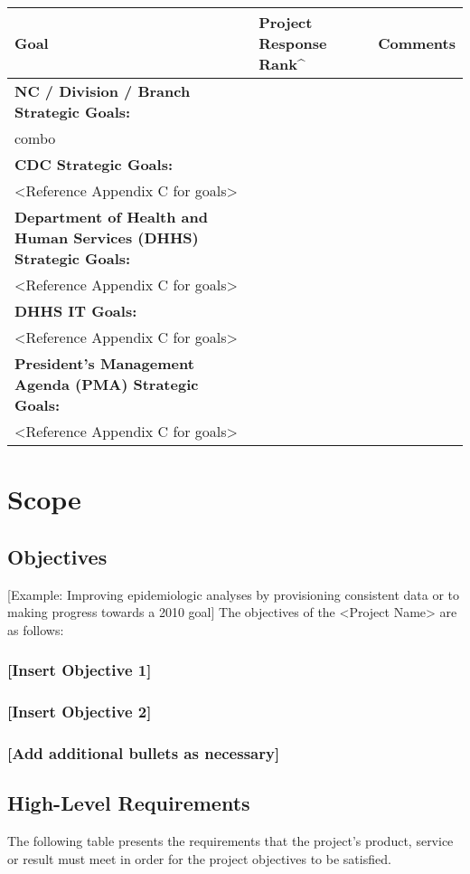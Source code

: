 \documentclass[11pt]{article}
\begin{document}
\begin{center}
\begin{tabular}{lll}
Goal & Project Response Rank\^{}\footnotemark & Comments\\
\hline
\textbf{NC / Division / Branch Strategic Goals:} &  & \\
combo &  & \\
\textbf{CDC Strategic Goals:} &  & \\
<Reference Appendix C for goals> &  & \\
\textbf{Department of Health and Human Services (DHHS) Strategic Goals:} &  & \\
<Reference Appendix C for goals> &  & \\
\textbf{DHHS IT Goals:} &  & \\
<Reference Appendix C for goals> &  & \\
\textbf{President’s Management Agenda (PMA) Strategic Goals:} &  & \\
<Reference Appendix C for goals> &  & \\
\end{tabular}
\end{center}

\section{Scope}
\label{sec:org73a19a5}
\subsection{Objectives}
\label{sec:orgd2020db}
[Example: Improving epidemiologic analyses by provisioning consistent data or to making progress towards a 2010 goal]
The objectives of the <Project Name> are as follows:
\subsubsection{[Insert Objective 1]}
\label{sec:org10a885d}
\subsubsection{[Insert Objective 2]}
\label{sec:org78bc8dd}
\subsubsection{[Add additional bullets as necessary]}
\label{sec:orgd253bf1}
\subsection{High-Level Requirements}
\label{sec:org7085041}
The following table presents the requirements that the project’s product, service or result must meet in order for the project objectives to be satisfied.  
\end{document}
